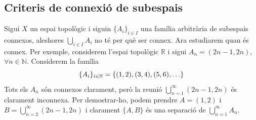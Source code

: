 \documentclass[../main.tex]{subfiles}
\begin{document}
\subsection{Criteris de connexió de subespais}

Sigui $X$ un espai topològic i siguin $\{A_i\}_{i\in I}$ una família arbitrària de subespais connexos, aleshores $\bigcup_{i\in I} A_i$ no té per què ser connex. Ara estudiarem quan és connex. Per exemple, considerem l'espai topològic $\mathbb{R}$ i sigui $A_n = (2n-1,2n)$, $\forall n\in\mathbb{N}$. Considerem la família
\begin{equation}
    \notag
    \{A_i\}_{i\in\mathbb{N}} = \{(1,2),(3,4),(5,6),\ldots\}
\end{equation}
Tots els $A_n$ són connexos clarament, però la reunió $\bigcup_{n=1}^\infty (2n-1,2n)$ és clarament inconnexa. Per demostrar-ho, podem prendre $A = (1,2)$ i $B = \bigcup_{n=2}^\infty (2n-1,2n)$ i clarament $\{A,B\}$ és una separació de $\bigcup_{n=1}^\infty A_n$.
\end{document}
